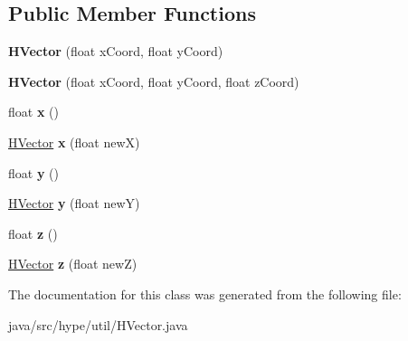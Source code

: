 \subsection*{Public Member Functions}
\begin{DoxyCompactItemize}
\item 
\hypertarget{classhype_1_1util_1_1_h_vector_a876fb3f042945cf01e83c7f11bcc29d4}{{\bfseries H\-Vector} (float x\-Coord, float y\-Coord)}\label{classhype_1_1util_1_1_h_vector_a876fb3f042945cf01e83c7f11bcc29d4}

\item 
\hypertarget{classhype_1_1util_1_1_h_vector_afe5eaa3e4277f2af8e7549eb0edf8d88}{{\bfseries H\-Vector} (float x\-Coord, float y\-Coord, float z\-Coord)}\label{classhype_1_1util_1_1_h_vector_afe5eaa3e4277f2af8e7549eb0edf8d88}

\item 
\hypertarget{classhype_1_1util_1_1_h_vector_ada4aa034ee78e6b2193de65b876688f5}{float {\bfseries x} ()}\label{classhype_1_1util_1_1_h_vector_ada4aa034ee78e6b2193de65b876688f5}

\item 
\hypertarget{classhype_1_1util_1_1_h_vector_a7c0ee8dc0c04087d7b9c2de85b82a2be}{\hyperlink{classhype_1_1util_1_1_h_vector}{H\-Vector} {\bfseries x} (float new\-X)}\label{classhype_1_1util_1_1_h_vector_a7c0ee8dc0c04087d7b9c2de85b82a2be}

\item 
\hypertarget{classhype_1_1util_1_1_h_vector_ace575b495f22952997ceaa6c171934a1}{float {\bfseries y} ()}\label{classhype_1_1util_1_1_h_vector_ace575b495f22952997ceaa6c171934a1}

\item 
\hypertarget{classhype_1_1util_1_1_h_vector_afeeb655afa147c61a1e0843fdd6b5202}{\hyperlink{classhype_1_1util_1_1_h_vector}{H\-Vector} {\bfseries y} (float new\-Y)}\label{classhype_1_1util_1_1_h_vector_afeeb655afa147c61a1e0843fdd6b5202}

\item 
\hypertarget{classhype_1_1util_1_1_h_vector_a19ed38d329935215aef5f0c93bdb1b57}{float {\bfseries z} ()}\label{classhype_1_1util_1_1_h_vector_a19ed38d329935215aef5f0c93bdb1b57}

\item 
\hypertarget{classhype_1_1util_1_1_h_vector_a2f926d05dbfa381a3add77a6c93f6385}{\hyperlink{classhype_1_1util_1_1_h_vector}{H\-Vector} {\bfseries z} (float new\-Z)}\label{classhype_1_1util_1_1_h_vector_a2f926d05dbfa381a3add77a6c93f6385}

\end{DoxyCompactItemize}


The documentation for this class was generated from the following file\-:\begin{DoxyCompactItemize}
\item 
java/src/hype/util/H\-Vector.\-java\end{DoxyCompactItemize}
